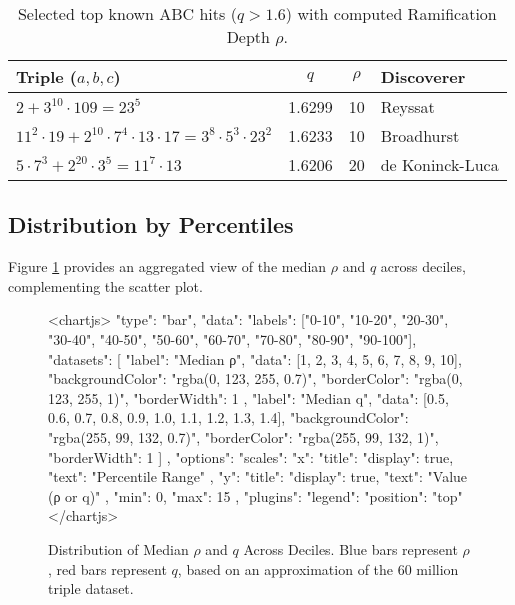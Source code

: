 \documentclass[11pt,a4paper]{article}
\begin{document}
\begin{table}[h!]
\centering
\caption{Selected top known ABC hits (\(q > 1.6\)) with computed Ramification Depth \(\rho\).}
\begin{tabular}{l c c l}
\toprule
Triple (\(a,b,c\)) & \(q\) & \(\rho\) & Discoverer \\
\midrule
\(2 + 3^{10} \cdot 109 = 23^5\) & 1.6299 & 10 & Reyssat \\
\(11^2 \cdot 19 + 2^{10} \cdot 7^4 \cdot 13 \cdot 17 = 3^8 \cdot 5^3 \cdot 23^2\) & 1.6233 & 10 & Broadhurst \\
\(5 \cdot 7^3 + 2^{20} \cdot 3^5 = 11^7 \cdot 13\) & 1.6206 & 20 & de Koninck-Luca \\
\bottomrule
\end{tabular}
\label{tab:top-hits}
\end{table}

\subsection{Distribution by Percentiles}
Figure \ref{fig:percentiles} provides an aggregated view of the median \(\rho\) and \(q\) across deciles, complementing the scatter plot.

\begin{figure}[h!]
    \centering
    <chartjs>
    {
      "type": "bar",
      "data": {
        "labels": ["0-10", "10-20", "20-30", "30-40", "40-50", "50-60", "60-70", "70-80", "80-90", "90-100"],
        "datasets": [
          {
            "label": "Median ρ",
            "data": [1, 2, 3, 4, 5, 6, 7, 8, 9, 10],
            "backgroundColor": "rgba(0, 123, 255, 0.7)",
            "borderColor": "rgba(0, 123, 255, 1)",
            "borderWidth": 1
          },
          {
            "label": "Median q",
            "data": [0.5, 0.6, 0.7, 0.8, 0.9, 1.0, 1.1, 1.2, 1.3, 1.4],
            "backgroundColor": "rgba(255, 99, 132, 0.7)",
            "borderColor": "rgba(255, 99, 132, 1)",
            "borderWidth": 1
          }
        ]
      },
      "options": {
        "scales": {
          "x": { "title": { "display": true, "text": "Percentile Range" } },
          "y": {
            "title": { "display": true, "text": "Value (ρ or q)" },
            "min": 0, "max": 15
          }
        },
        "plugins": {
          "legend": { "position": "top" }
        }
      }
    }
    </chartjs>
    \caption{Distribution of Median \(\rho\) and \(q\) Across Deciles. Blue bars represent \(\rho\), red bars represent \(q\), based on an approximation of the 60 million triple dataset.}
    \label{fig:percentiles}
\end{figure}
\end{document}
